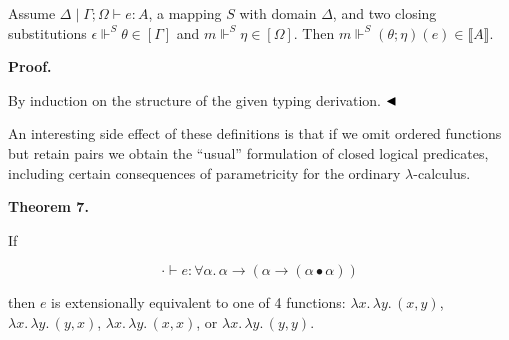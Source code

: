  
Assume $\Delta\mid\Gamma\mathrel{;}\Omega\vdash e:A$, a mapping $S$ with domain $\Delta$, and two closing substitutions $\epsilon\Vdash^{S}\theta\in[\Gamma]$ and $m\Vdash^{S}\eta\in[\Omega]$. Then $m\Vdash^{S}(\theta\mathrel{;}\eta)(e)\in\llbracket A\rrbracket$.\par
 
 
 
 
\par\medskip\noindent\textbf{Proof.}\par
 
 
By induction on the structure of the given typing derivation. $\hfill\blacktriangleleft$\par
 
 
 
An interesting side effect of these definitions is that if we omit ordered functions but retain pairs we obtain the “usual” formulation of closed logical predicates, including certain consequences of parametricity for the ordinary $\lambda$-calculus.\par
 
 
 
\par\medskip\noindent\textbf{Theorem 7.}\par
 
 
If\par
  
\par  \quad  \[\cdot\vdash e:\forall\alpha.\,\alpha\mathbin{\rightarrow}(\alpha\mathbin{\rightarrow}(\alpha\bullet\alpha))\]\quad  \quad  
  
then $e$ is extensionally equivalent to one of 4 functions: $\lambda x.\,\lambda y.\,(x,y)$, $\lambda x.\,\lambda y.\,(y,x)$, $\lambda x.\,\lambda y.\,(x,x)$, or $\lambda x.\,\lambda y.\,(y,y)$.\par
 
 
 
 
